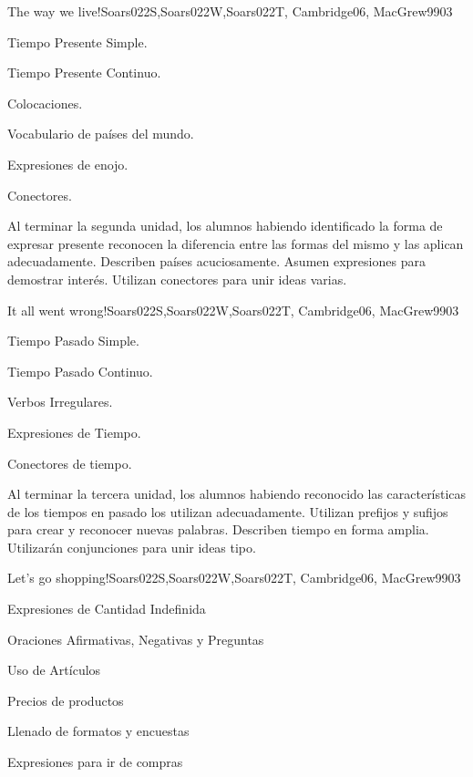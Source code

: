 \begin{syllabus}
\begin{unit}{The way we live!}{Soars022S,Soars022W,Soars022T, Cambridge06, MacGrew99}{0}{3}
   \begin{topics}
      \item Tiempo Presente Simple.
      \item Tiempo Presente Continuo.
      \item Colocaciones.
      \item Vocabulario de países del  mundo.
      \item Expresiones de enojo.
      \item Conectores.
   \end{topics}

   \begin{unitgoals}
      \item Al terminar la segunda unidad, los alumnos habiendo identificado la forma de expresar presente reconocen la diferencia entre las formas del mismo y las aplican adecuadamente. Describen países acuciosamente.  Asumen expresiones para demostrar interés. Utilizan conectores para unir ideas varias.  
   \end{unitgoals}
\end{unit}

\begin{unit}{It all went wrong!}{Soars022S,Soars022W,Soars022T, Cambridge06, MacGrew99}{0}{3}
   \begin{topics}
      \item Tiempo Pasado Simple.
      \item Tiempo Pasado Continuo.
      \item Verbos Irregulares.
      \item Expresiones de Tiempo.
      \item Conectores de tiempo.
   \end{topics}

   \begin{unitgoals}
      \item Al terminar la tercera unidad, los alumnos habiendo reconocido las características de los tiempos en pasado los utilizan adecuadamente. Utilizan prefijos y sufijos para crear y reconocer nuevas palabras. Describen tiempo en forma amplia. Utilizarán conjunciones para unir ideas tipo. 
   \end{unitgoals}
\end{unit}

\begin{unit}{Let's go shopping!}{Soars022S,Soars022W,Soars022T, Cambridge06, MacGrew99}{0}{3}
   \begin{topics}
      \item Expresiones de Cantidad Indefinida
      \item Oraciones Afirmativas, Negativas y Preguntas
      \item Uso de Artículos
      \item Precios de productos
      \item Llenado de formatos y encuestas
      \item Expresiones para ir de compras
   \end{topics}


\end{unit}
\end{syllabus}
